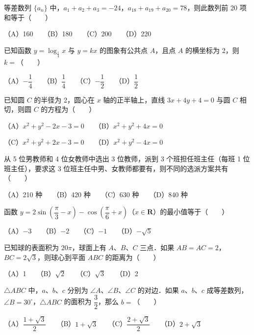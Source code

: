 \begin{question}
等差数列 $\{a_n\}$ 中，$a_1+a_2+a_3=-24$，$a_{18}+a_{19}+a_{20}=78$，则此数列前 20 项和等于\mbox{（　　）}

（A）160　　（B）180　　（C）200　　（D）220

\end{question}
\begin{question}
已知函数 $y=\log_{\frac{1}{4}}x$ 与 $y=kx$ 的图象有公共点 $A$，且点 $A$ 的横坐标为 2，则 $k=$\mbox{（　　）}

（A）$-\dfrac{1}{4}$　　（B）$\dfrac{1}{4}$　　（C）$-\dfrac{1}{2}$　　（D）$\dfrac{1}{2}$

\end{question}
\begin{question}
已知圆 $C$ 的半径为 2，圆心在 $x$ 轴的正半轴上，直线 $3x+4y+4=0$ 与圆 $C$ 相切，则圆 $C$ 的方程为\mbox{（　　）}

（A）$x^2+y^2-2x-3=0$　　（B）$x^2+y^2+4x=0$

（C）$x^2+y^2+2x-3=0$　　（D）$x^2+y^2-4x=0$

\end{question}
\begin{question}
从 5 位男教师和 4 位女教师中选出 3 位教师，派到 3 个班担任班主任（每班 1 位班主任），要求这 3 位班主任中男、女教师都要有，则不同的选派方案共有\mbox{（　　）}

（A）210 种　　（B）420 种　　（C）630 种　　（D）840 种

\end{question}
\begin{question}
函数 $y=2\sin\left(\dfrac{\pi}{3}-x\right)-\cos\left(\dfrac{\pi}{6}+x\right)$（$x\in\mathbf{R}$）的最小值等于\mbox{（　　）}

（A）$-3$　　（B）$-2$　　（C）$-1$　　（D）$-\sqrt{5}$

\end{question}
\begin{question}
已知球的表面积为 $20\pi$，球面上有 $A$、$B$、$C$ 三点．如果 $AB=AC=2$，$BC=2\sqrt{3}$，则球心到平面 $ABC$ 的距离为\mbox{（　　）}

（A）1　　（B）$\sqrt{2}$　　（C）$\sqrt{3}$　　（D）2

\end{question}
\begin{question}
$\triangle ABC$ 中，$a$、$b$、$c$ 分别为 $\angle A$、$\angle B$、$\angle C$ 的对边．如果 $a$、$b$、$c$ 成等差数列，$\angle B=30^\circ$，$\triangle ABC$ 的面积为 $\dfrac{3}{2}$，那么 $b=$\mbox{（　　）}

（A）$\dfrac{1+\sqrt{3}}{2}$　　（B）$1+\sqrt{3}$　　（C）$\dfrac{2+\sqrt{3}}{2}$　　（D）$2+\sqrt{3}$

\end{question}

